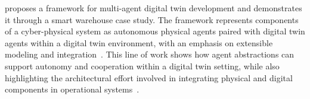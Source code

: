\citeauthor{marah2024_madtwin} proposes a framework for multi-agent digital twin development and demonstrates it through a smart warehouse case study. The framework represents components of a cyber-physical system as autonomous physical agents paired with digital twin agents within a digital twin environment, with an emphasis on extensible modeling and integration~\cite{marah2024_madtwin}.
This line of work shows how agent abstractions can support autonomy and cooperation within a digital twin setting, while also highlighting the architectural effort involved in integrating physical and digital components in operational systems~\cite{marah2024_madtwin}.




